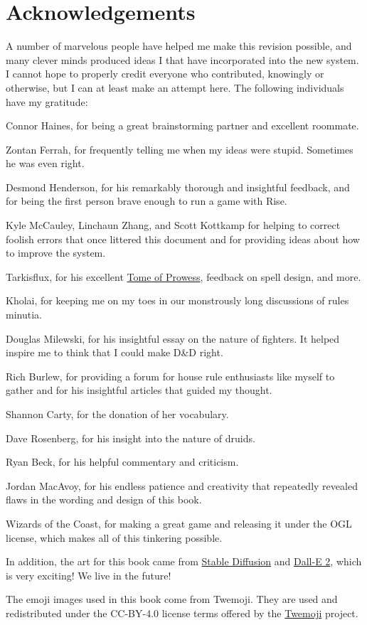 \chapter*{Acknowledgements}
A number of marvelous people have helped me make this revision possible, and many clever minds produced ideas I that have incorporated into the new system. I cannot hope to properly credit everyone who contributed, knowingly or otherwise, but I can at least make an attempt here. The following individuals have my gratitude:

Connor Haines, for being a great brainstorming partner and excellent roommate.

Zontan Ferrah, for frequently telling me when my ideas were stupid. Sometimes he was even right.

Desmond Henderson, for his remarkably thorough and insightful feedback, and for being the first person brave enough to run a game with Rise.

Kyle McCauley, Linchaun Zhang, and Scott Kottkamp for helping to correct foolish errors that once littered this document and for providing ideas about how to improve the system.

Tarkisflux, for his excellent \href{http://dnd-wiki.org/wiki/Tome_of_Prowess_(3.5e_Sourcebook)}{Tome of Prowess}, feedback on spell design, and more.

Kholai, for keeping me on my toes in our monstrously long discussions of rules minutia.

Douglas Milewski, for his insightful essay on the nature of fighters. It helped inspire me to think that I could make D\&D right.

Rich Burlew, for providing a forum for house rule enthusiasts like myself to gather and for his insightful articles that guided my thought.

Shannon Carty, for the donation of her vocabulary.

Dave Rosenberg, for his insight into the nature of druids.

Ryan Beck, for his helpful commentary and criticism.

Jordan MacAvoy, for his endless patience and creativity that repeatedly revealed flaws in the wording and design of this book.

Wizards of the Coast, for making a great game and releasing it under the OGL license, which makes all of this tinkering possible.

In addition, the art for this book came from \href{https://huggingface.co/spaces/stabilityai/stable-diffusion}{Stable Diffusion} and \href{https://openai.com/dall-e-2/}{Dall-E 2}, which is very exciting! We live in the future!

The emoji images used in this book come from Twemoji. They are used and redistributed under the CC-BY-4.0 license terms offered by the \href{https://twemoji.twitter.com/}{Twemoji} project.

